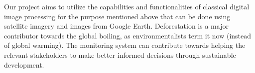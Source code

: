 \documentclass[12pt,a4paper,IEEEtran]{article}
\begin{document}
Our project aims to utilize the capabilities and functionalities of classical digital image processing for the purpose mentioned above that can be done using satellite imagery and images from Google Earth.
Deforestation is a major contributor towards
the global boiling, as environmentalists term it now (instead of global warming). The monitoring system can contribute towards helping the relevant stakeholders to make better informed decisions through sustainable development. \cite{thomas2023global}

\end{document}
